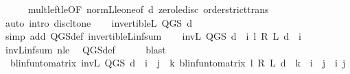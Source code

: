 \begin{isabellebody}
\ \ \ \ \isamarkupfalse%
\ mult{\isacharunderscore}{\kern0pt}left{\isacharunderscore}{\kern0pt}le{\isacharbrackleft}{\kern0pt}OF\ norm{\isacharunderscore}{\kern0pt}{\isasymP}\isactrlsub L{\isacharunderscore}{\kern0pt}le{\isacharunderscore}{\kern0pt}one{\isacharbrackleft}{\kern0pt}of\ d{\isacharbrackright}{\kern0pt}\ zero{\isacharunderscore}{\kern0pt}le{\isacharunderscore}{\kern0pt}disc{\isacharbrackright}{\kern0pt}\ order{\isachardot}{\kern0pt}strict{\isacharunderscore}{\kern0pt}trans{}\isanewline
\ \ \ \ \isamarkupfalse%
\ {\isacharparenleft}{\kern0pt}auto\ intro{\isacharcolon}{\kern0pt}\ disc{\isacharunderscore}{\kern0pt}lt{\isacharunderscore}{\kern0pt}one{\isacharparenright}{\kern0pt}\isanewline
\ \ \isamarkupfalse%
\ {\isachardoublequoteopen}invertible\isactrlsub L\ {\isacharparenleft}{\kern0pt}Q{\isacharunderscore}{\kern0pt}GS\ d{\isacharparenright}{\kern0pt}{\isachardoublequoteclose}\isanewline
\ \ \ \ \isamarkupfalse%
\ {\isacharparenleft}{\kern0pt}simp\ add{\isacharcolon}{\kern0pt}\ Q{\isacharunderscore}{\kern0pt}GS{\isacharunderscore}{\kern0pt}def\ invertible\isactrlsub L{\isacharunderscore}{\kern0pt}inf{\isacharunderscore}{\kern0pt}sum{\isacharparenright}{\kern0pt}\isanewline
\ \ \isamarkupfalse%
\ {\isachardoublequoteopen}inv\isactrlsub L\ {\isacharparenleft}{\kern0pt}Q{\isacharunderscore}{\kern0pt}GS\ d{\isacharparenright}{\kern0pt}\ {\isacharequal}{\kern0pt}\ {\isacharparenleft}{\kern0pt}{\isasymSum}i{\isachardot}{\kern0pt}\ {\isacharparenleft}{\kern0pt}l\ {\isacharasterisk}{\kern0pt}\isactrlsub R\ {\isasymP}\isactrlsub L\ d{\isacharparenright}{\kern0pt}\ {\isacharcircum}{\kern0pt}{\isacharcircum}{\kern0pt}\ i{\isacharparenright}{\kern0pt}{\isachardoublequoteclose}\isanewline
\ \ \ \ \isamarkupfalse%
\ inv\isactrlsub L{\isacharunderscore}{\kern0pt}inf{\isacharunderscore}{\kern0pt}sum\ n{\isacharunderscore}{\kern0pt}le\ \isamarkupfalse%
\ Q{\isacharunderscore}{\kern0pt}GS{\isacharunderscore}{\kern0pt}def\isanewline
\ \ \ \ \isamarkupfalse%
\ blast\isanewline
\ \ \isamarkupfalse%
\ {\isacharasterisk}{\kern0pt}{\isacharcolon}{\kern0pt}\ {\isachardoublequoteopen}blinfun{\isacharunderscore}{\kern0pt}to{\isacharunderscore}{\kern0pt}matrix\ {\isacharparenleft}{\kern0pt}inv\isactrlsub L\ {\isacharparenleft}{\kern0pt}Q{\isacharunderscore}{\kern0pt}GS\ d{\isacharparenright}{\kern0pt}{\isacharparenright}{\kern0pt}\ {\isachardollar}{\kern0pt}\ i\ {\isachardollar}{\kern0pt}\ j\ {\isacharequal}{\kern0pt}\ {\isacharparenleft}{\kern0pt}{\isasymSum}k{\isachardot}{\kern0pt}\ blinfun{\isacharunderscore}{\kern0pt}to{\isacharunderscore}{\kern0pt}matrix\ {\isacharparenleft}{\kern0pt}{\isacharparenleft}{\kern0pt}l\ {\isacharasterisk}{\kern0pt}\isactrlsub R\ {\isasymP}\isactrlsub L\ d{\isacharparenright}{\kern0pt}\ {\isacharcircum}{\kern0pt}{\isacharcircum}{\kern0pt}\ k{\isacharparenright}{\kern0pt}\ {\isachardollar}{\kern0pt}\ i\ {\isachardollar}{\kern0pt}\ j{\isacharparenright}{\kern0pt}{\isachardoublequoteclose}\ \ i\ j\isanewline

\end{isabellebody}
